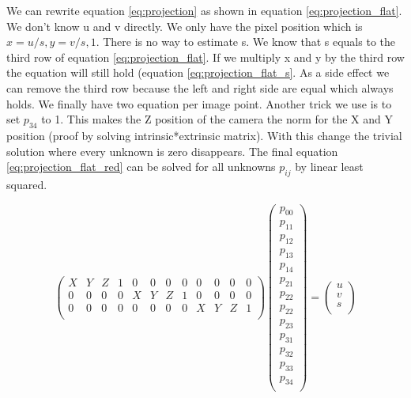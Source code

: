 \documentclass[11pt,a4paper,titlepage,oneside]{report}
\begin{document}
We can rewrite equation \ref{eq:projection} as shown in equation \ref{eq:projection_flat}. We don't know u and v directly. We only have the pixel position which is $x=u/s, y=v/s, 1$. There is no way to estimate s. We know that s equals to the third row of equation \ref{eq:projection_flat}. If we multiply x and y by the third row the equation will still hold (equation \ref{eq:projection_flat_s}. As a side effect we can remove the third row because the left and right side are equal which always holds. We finally have two equation per image point. Another trick we use is to set $p_{34}$ to 1. This makes the Z position of the camera the norm for the X and Y position (proof by solving intrinsic*extrinsic matrix). With this change the trivial solution where every unknown is zero disappears. The final equation \ref{eq:projection_flat_red} can be solved for all unknowns $p_{ij}$ by linear least squared.

\setcounter{MaxMatrixCols}{15}
\begin{equation}\label{eq:projection_flat}
	\begin{pmatrix}
		X & Y & Z & 1 & 0 & 0 & 0 & 0 & 0 & 0 & 0 & 0\\
		0 & 0 & 0 & 0 & X & Y & Z & 1 & 0 & 0 & 0 & 0\\
		0 & 0 & 0 & 0 & 0 & 0 & 0 & 0 & X & Y & Z & 1\\
	\end{pmatrix}
	\begin{pmatrix}p_{00}\\
		p_{11}\\
		p_{12}\\
		p_{13}\\
		p_{14}\\
		p_{21}\\
		p_{22}\\
		p_{22}\\
		p_{23}\\
		p_{31}\\
		p_{32}\\
		p_{33}\\
		p_{34} \\
	\end{pmatrix}=
	\begin{pmatrix}u\\
		v\\
		s\\
	\end{pmatrix}
\end{equation}
\end{document}
